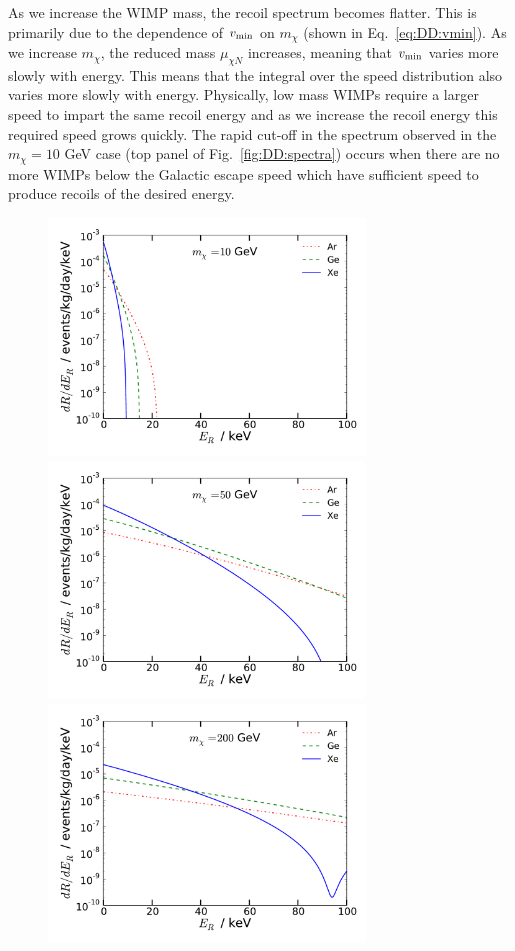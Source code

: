 As we increase the WIMP mass, the recoil spectrum becomes flatter. This is primarily due to the dependence of $\vmin$ on $m_\chi$ (shown in Eq.~\ref{eq:DD:vmin}). As we increase $m_\chi$, the reduced mass $\mu_{\chi N}$ increases, meaning that $\vmin$ varies more slowly with energy. This means that the integral over the speed distribution also varies more slowly with energy. Physically, low mass WIMPs require a larger speed to impart the same recoil energy and as we increase the recoil energy this required speed grows quickly. The rapid cut-off in the spectrum observed in the $m_\chi = 10$ GeV case (top panel of Fig.~\ref{fig:DD:spectra}) occurs when there are no more WIMPs below the Galactic escape speed which have sufficient speed to produce recoils of the desired energy. 

\begin{figure}[p]
\centering
  \includegraphics[width=0.75\textwidth]{DirectDetection/Spectra_10GeV.pdf}
  \includegraphics[width=0.75\textwidth]{DirectDetection/Spectra_50GeV.pdf}
  \includegraphics[width=0.75\textwidth]{DirectDetection/Spectra_200GeV.pdf}

\end{figure}
